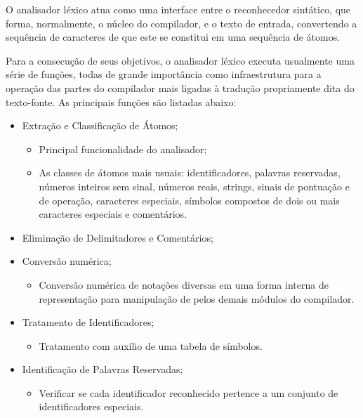 
O analisador léxico atua como uma interface entre o reconhecedor sintático, que forma, normalmente, o núcleo do compilador, e o texto de entrada, convertendo a sequência de caracteres de que este se constitui em uma sequência de átomos.

Para a consecução de seus objetivos, o analisador léxico executa usualmente uma série de funções, todas de grande importância como infraestrutura para a operação das partes do compilador mais ligadas à tradução propriamente dita do texto-fonte. As principais funções são listadas abaixo:

\begin{itemize}

	\item Extração e Classificação de Átomos;
	\begin{itemize}
		\item Principal funcionalidade do analisador;
		\item As classes de átomos mais usuais: identificadores, palavras reservadas, números inteiros sem sinal, números reais, strings, sinais de pontuação e de operação, caracteres especiais, símbolos compostos de dois ou mais caracteres especiais e comentários.
	\end{itemize}
	
	\item Eliminação de Delimitadores e Comentários;
	
	\item Conversão numérica;
	\begin{itemize}
		\item Conversão numérica de notações diversas em uma forma interna de representação para manipulação de pelos demais módulos do compilador.
	\end{itemize}
	
	\item Tratamento de Identificadores;
	\begin{itemize}
		\item Tratamento com auxílio de uma tabela de símbolos.
	\end{itemize}
	
	\item Identificação de Palavras Reservadas;
	\begin{itemize}
		\item Verificar se cada identificador reconhecido pertence a um conjunto de identificadores especiais.
	\end{itemize}
	

\end{itemize}
